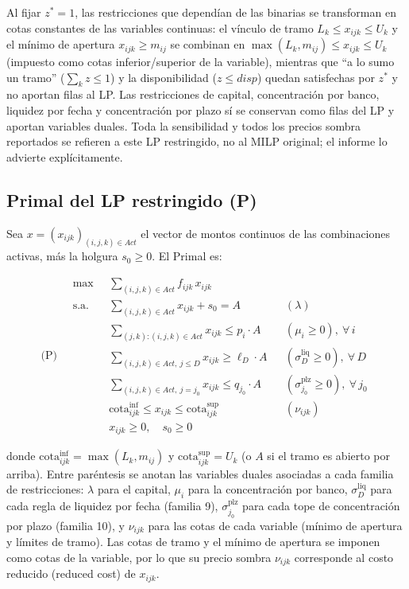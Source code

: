 \documentclass[11pt,a4paper]{article}
\begin{document}
Al fijar $z^* = 1$, las restricciones que dependían de las binarias se transforman en cotas constantes de las variables continuas: el vínculo de tramo $L_k \le x_{ijk} \le U_k$ y el mínimo de apertura $x_{ijk} \ge m_{ij}$ se combinan en $\max(L_k, m_{ij}) \le x_{ijk} \le U_k$ (impuesto como cotas inferior/superior de la variable), mientras que ``a lo sumo un tramo'' ($\sum_k z \le 1$) y la disponibilidad ($z \le disp$) quedan satisfechas por $z^*$ y no aportan filas al LP. Las restricciones de capital, concentración por banco, liquidez por fecha y concentración por plazo sí se conservan como filas del LP y aportan variables duales. Toda la sensibilidad y todos los precios sombra reportados se refieren a este LP restringido, no al MILP original; el informe lo advierte explícitamente.

\subsection{Primal del LP restringido (P)}

Sea $x = (x_{ijk})_{(i,j,k)\in Act}$ el vector de montos continuos de las combinaciones activas, más la holgura $s_0 \ge 0$. El Primal es:

\[
\text{(P)}\quad
\begin{aligned}
\max\ \ & \sum_{(i,j,k)\in Act} f_{ijk}\, x_{ijk} \\[2pt]
\text{s.a.}\quad
& \sum_{(i,j,k)\in Act} x_{ijk} + s_0 = A && (\lambda) \\
& \sum_{(j,k):(i,j,k)\in Act} x_{ijk} \le p_i \cdot A && (\mu_i \ge 0),\ \forall\, i \\
& \sum_{(i,j,k)\in Act,\ j\le D} x_{ijk} \ge \ell_D \cdot A && (\sigma^{\text{liq}}_D \ge 0),\ \forall\, D \\
& \sum_{(i,j,k)\in Act,\ j = j_0} x_{ijk} \le q_{j_0} \cdot A && (\sigma^{\text{plz}}_{j_0} \ge 0),\ \forall\, j_0 \\
& \text{cota}^{\text{inf}}_{ijk} \le x_{ijk} \le \text{cota}^{\text{sup}}_{ijk} && (\nu_{ijk}) \\
& x_{ijk} \ge 0,\quad s_0 \ge 0 &&
\end{aligned}
\]

donde $\text{cota}^{\text{inf}}_{ijk} = \max(L_k, m_{ij})$ y $\text{cota}^{\text{sup}}_{ijk} = U_k$ (o $A$ si el tramo es abierto por arriba). Entre paréntesis se anotan las variables duales asociadas a cada familia de restricciones: $\lambda$ para el capital, $\mu_i$ para la concentración por banco, $\sigma^{\text{liq}}_D$ para cada regla de liquidez por fecha (familia 9), $\sigma^{\text{plz}}_{j_0}$ para cada tope de concentración por plazo (familia 10), y $\nu_{ijk}$ para las cotas de cada variable (mínimo de apertura y límites de tramo). Las cotas de tramo y el mínimo de apertura se imponen como cotas de la variable, por lo que su precio sombra $\nu_{ijk}$ corresponde al costo reducido (reduced cost) de $x_{ijk}$.
\end{document}
